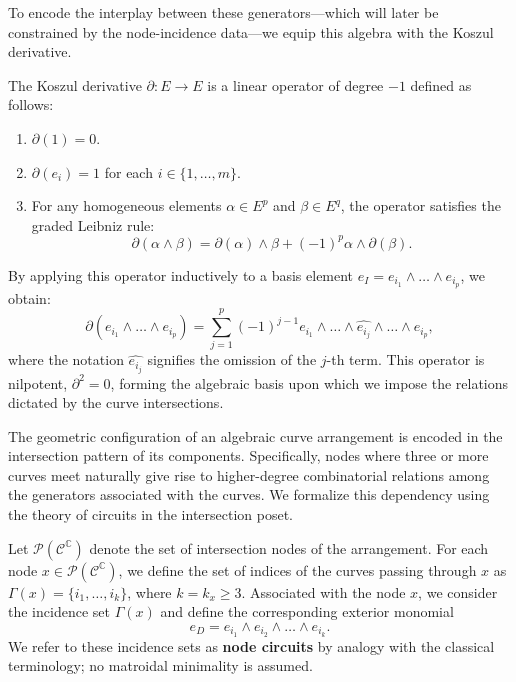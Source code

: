 \documentclass[article,11pt]{amsart} \numberwithin{equation}{section}
\numberwithin{equation}{section}
\begin{document}
{To encode the interplay between these generators—which will later be constrained by the node-incidence data—we equip this algebra with the Koszul derivative.

\begin{df} \label{def:koszul}
	The Koszul derivative $\partial : E \longrightarrow E$ is a linear operator of degree $-1$ defined as follows:
	\begin{enumerate}
		\item $\partial(1) = 0$.
		\item $\partial(e_i) = 1$ for each $i \in \{1, \dots, m\}$.
		\item For any homogeneous elements $\alpha \in E^p$ and $\beta \in E^q$, the operator satisfies the graded Leibniz rule:
		\[ \partial(\alpha \wedge \beta) = \partial(\alpha) \wedge \beta + (-1)^p \alpha \wedge \partial(\beta). \]
	\end{enumerate}
\end{df}

By applying this operator inductively to a basis element $e_I = e_{i_1} \wedge \dots \wedge e_{i_p}$, we obtain:
\[ \partial(e_{i_1} \wedge \dots \wedge e_{i_p}) = \sum_{j=1}^p (-1)^{j-1} e_{i_1} \wedge \dots \wedge \widehat{e_{i_j}} \wedge \dots \wedge e_{i_p}, \]
where the notation $\widehat{e_{i_j}}$ signifies the omission of the $j$-th term. This operator is nilpotent, $\partial^2 = 0$, forming the algebraic basis upon which we impose the relations dictated by the curve intersections.

The geometric configuration of an algebraic curve arrangement is encoded in the intersection pattern of its components. Specifically, nodes where three or more curves meet naturally give rise to higher-degree combinatorial relations among the generators associated with the curves. We formalize this dependency using the theory of circuits in the intersection poset.

\begin{df} \label{def6.3}
	Let $\mathcal{P}(\mathcal{C}^\mathbb{C})$ denote the set of intersection nodes of the arrangement. For each node $x \in \mathcal{P}(\mathcal{C}^\mathbb{C})$, we define the set of indices of the curves passing through $x$ as $\Gamma(x) = \{i_1, \dots, i_k\}$, where $k = k_x \ge 3$. 
	Associated with the node $x$, we consider the incidence set $\Gamma(x)$ and define the corresponding exterior monomial
	\[ e_D = e_{i_1} \wedge e_{i_2} \wedge \dots \wedge e_{i_k}. \]
	We refer to these incidence sets as \textbf{node circuits} by analogy with the classical terminology; no matroidal minimality is assumed.
\end{df}

}
\end{document}
